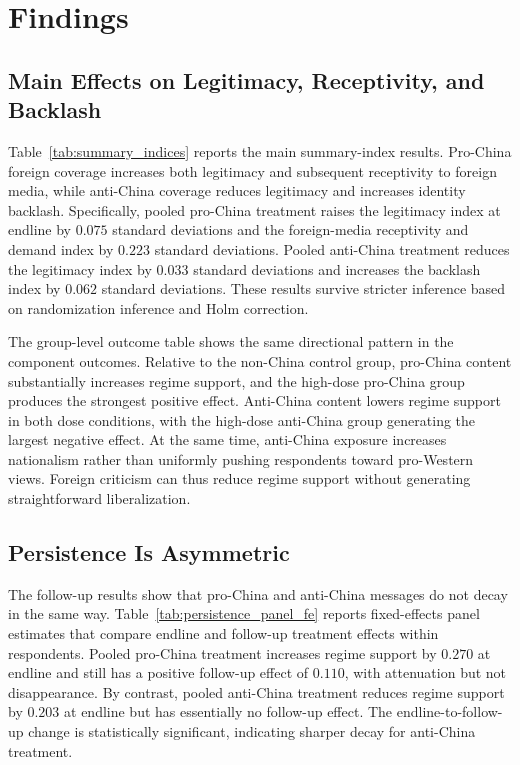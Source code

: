 \documentclass[12pt,american]{article}
\begin{document}
	\section*{Findings}
	
	\subsection*{Main Effects on Legitimacy, Receptivity, and Backlash}
	
	Table~\ref{tab:summary_indices} reports the main summary-index results. Pro-China foreign coverage increases both legitimacy and subsequent receptivity to foreign media, while anti-China coverage reduces legitimacy and increases identity backlash. Specifically, pooled pro-China treatment raises the legitimacy index at endline by \(0.075\) standard deviations and the foreign-media receptivity and demand index by \(0.223\) standard deviations. Pooled anti-China treatment reduces the legitimacy index by \(0.033\) standard deviations and increases the backlash index by \(0.062\) standard deviations. These results survive stricter inference based on randomization inference and Holm correction.
	
	
	
	The group-level outcome table shows the same directional pattern in the component outcomes. Relative to the non-China control group, pro-China content substantially increases regime support, and the high-dose pro-China group produces the strongest positive effect. Anti-China content lowers regime support in both dose conditions, with the high-dose anti-China group generating the largest negative effect. At the same time, anti-China exposure increases nationalism rather than uniformly pushing respondents toward pro-Western views. Foreign criticism can thus reduce regime support without generating straightforward liberalization.
	
	
	
	\subsection*{Persistence Is Asymmetric}
	
	The follow-up results show that pro-China and anti-China messages do not decay in the same way. Table~\ref{tab:persistence_panel_fe} reports fixed-effects panel estimates that compare endline and follow-up treatment effects within respondents. Pooled pro-China treatment increases regime support by \(0.270\) at endline and still has a positive follow-up effect of \(0.110\), with attenuation but not disappearance. By contrast, pooled anti-China treatment reduces regime support by \(0.203\) at endline but has essentially no follow-up effect. The endline-to-follow-up change is statistically significant, indicating sharper decay for anti-China treatment.
	
\end{document}
